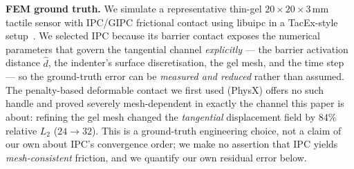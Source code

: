 \documentclass[conference]{IEEEtran}
\begin{document}
\textbf{FEM ground truth.} We simulate a representative thin-gel
$20\times20\times3$\,mm tactile sensor with
IPC/GIPC frictional contact using libuipc in a TacEx-style
setup~\cite{huang2024gipc,nguyen2024tacex}. We selected IPC because its barrier
contact exposes the numerical parameters that govern the tangential channel
\emph{explicitly} --- the barrier activation distance $\hat d$, the indenter's
surface discretisation, the gel mesh, and the time step --- so the ground-truth
error can be \emph{measured and reduced} rather than assumed. The penalty-based
deformable contact we first used (PhysX) offers no such handle and proved severely
mesh-dependent in exactly the channel this paper is about: refining the gel mesh
changed the \emph{tangential} displacement field by $84\%$ relative $L_2$
($24\!\to\!32$). This is a ground-truth engineering choice, not a claim of our own
about IPC's convergence order; we make no assertion that IPC yields
\emph{mesh-consistent} friction, and we quantify our own residual error below.
\end{document}
